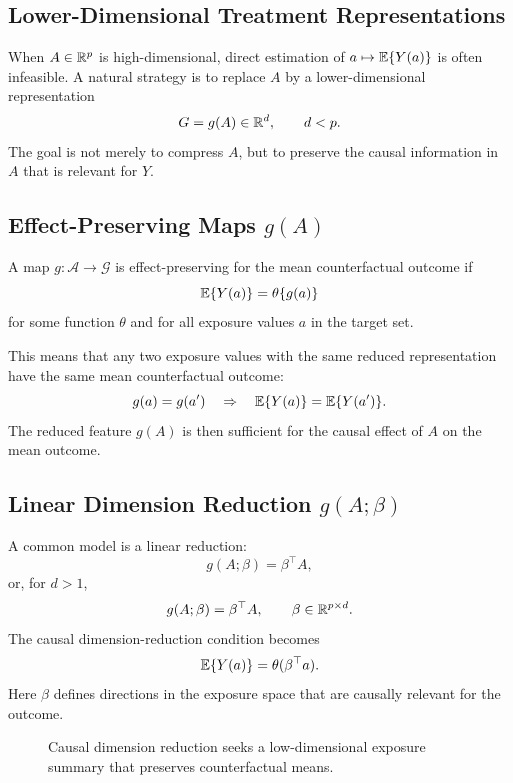 \label{lec:9-3}

\subsection{Lower-Dimensional Treatment Representations}

When $A\in\mathbb{R}^p$ is high-dimensional, direct estimation of
$a\mapsto\mathbb{E}\{Y(a)\}$ is often infeasible. A natural strategy is to replace
$A$ by a lower-dimensional representation
\[
  G=g(A)\in\mathbb{R}^d,\qquad d<p.
\]
The goal is not merely to compress $A$, but to preserve the causal information
in $A$ that is relevant for $Y$.

\subsection{Effect-Preserving Maps $g(A)$}

\begin{definition}
A map $g:\mathcal{A}\rightarrow\mathcal{G}$ is effect-preserving for the mean
counterfactual outcome if
\[
  \mathbb{E}\{Y(a)\}=\theta\{g(a)\}
\]
for some function $\theta$ and for all exposure values $a$ in the target set.
\end{definition}

This means that any two exposure values with the same reduced representation
have the same mean counterfactual outcome:
\[
  g(a)=g(a')\quad\Rightarrow\quad \mathbb{E}\{Y(a)\}=\mathbb{E}\{Y(a')\}.
\]
The reduced feature $g(A)$ is then sufficient for the causal effect of $A$ on
the mean outcome.

\subsection{Linear Dimension Reduction $g(A;\beta)$}

A common model is a linear reduction:
\[
  g(A;\beta)=\beta^\top A,
\]
or, for $d>1$,
\[
  g(A;\beta)=\beta^\top A,\qquad \beta\in\mathbb{R}^{p\times d}.
\]
The causal dimension-reduction condition becomes
\[
  \mathbb{E}\{Y(a)\}=\theta(\beta^\top a).
\]
Here $\beta$ defines directions in the exposure space that are causally relevant
for the outcome.

\begin{figure}[H]
\centering
{}
\caption{Causal dimension reduction seeks a low-dimensional exposure summary that preserves counterfactual means.}
\label{fig:ch9-causal-dimred}
\end{figure}

